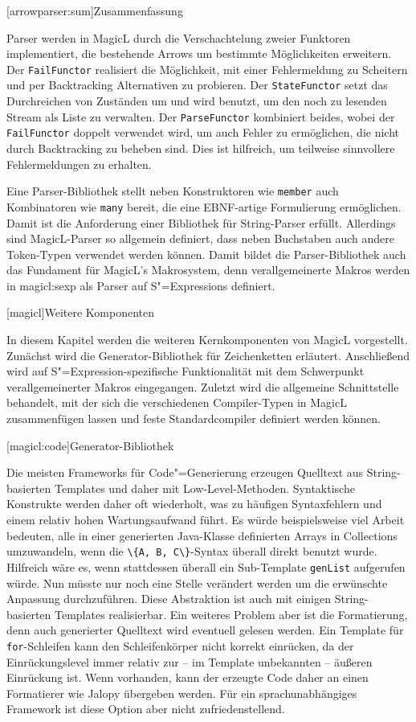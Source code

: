 \documentclass[12pt, a4paper, bibgerm]{scrbook}
\newcommand\icode[1]{\lstinline?#1?}
\newcommand\lchapter{}
\newcommand\lsection{}
\newcommand\sref{}
\newcommand{\sexp}{S"=Expression}
\newcommand{\sexps}{S"=Expressions}
\newcommand{\cgen}{Code"=Generierung}
\begin{document}
\lsection[arrowparser:sum]{Zusammenfassung}

Parser werden in MagicL durch die Verschachtelung zweier Funktoren
implementiert, die bestehende Arrows um bestimmte Möglichkeiten
erweitern. Der \icode{FailFunctor} realisiert die Möglichkeit, mit einer
Fehlermeldung zu Scheitern und per Backtracking Alternativen zu
probieren. Der \icode{StateFunctor} setzt das Durchreichen von Zuständen
um und wird benutzt, um den noch zu lesenden Stream als Liste zu
verwalten. Der \icode{ParseFunctor} kombiniert beides, wobei der
\icode{FailFunctor} doppelt verwendet wird, um auch Fehler zu
ermöglichen, die nicht durch Backtracking zu beheben sind. Dies ist
hilfreich, um teilweise sinnvollere Fehlermeldungen zu erhalten.

Eine Parser-Bibliothek stellt neben Konstruktoren wie \icode{member}
auch Kombinatoren wie \icode{many} bereit, die eine EBNF-artige
Formulierung ermöglichen. Damit ist die Anforderung einer Bibliothek
für String-Parser erfüllt. Allerdings sind MagicL-Parser so allgemein
definiert, dass neben Buchstaben auch andere Token-Typen verwendet
werden können. Damit bildet die Parser-Bibliothek auch das Fundament für
MagicL's Makrosystem, denn verallgemeinerte Makros werden in
\sref{magicl:sexp} als Parser auf \sexps{} definiert.

\lchapter[magicl]{Weitere Komponenten}

In diesem Kapitel werden die weiteren Kernkomponenten von MagicL
vorgestellt. Zunächst wird die Generator-Bibliothek für Zeichenketten
erläutert. Anschließend wird auf \sexp{}-spezifische Funktionalität
mit dem Schwerpunkt verallgemeinerter Makros eingegangen. Zuletzt wird
die allgemeine Schnittstelle behandelt, mit der sich die verschiedenen
Compiler-Typen in MagicL zusammenfügen lassen und feste Standardcompiler
definiert werden können.

\lsection[magicl:code]{Generator-Bibliothek}

Die meisten Frameworks für \cgen{} erzeugen Quelltext aus
String-basierten Templates und daher mit
Low-Level-Methoden. Syntaktische Konstrukte werden daher oft wiederholt,
was zu häufigen Syntaxfehlern und einem relativ hohen Wartungsaufwand
führt. Es würde beispielsweise viel Arbeit bedeuten, alle in einer
generierten Java-Klasse definierten Arrays in Collections umzuwandeln,
wenn die \icode{\{A, B, C\}}-Syntax überall direkt benutzt
wurde. Hilfreich wäre es, wenn stattdessen überall ein Sub-Template
\icode{genList} aufgerufen würde.  Nun müsste nur noch eine Stelle
verändert werden um die erwünschte Anpassung durchzuführen. Diese
Abstraktion ist auch mit einigen String-basierten Templates
realisierbar. Ein weiteres Problem aber ist die Formatierung, denn auch
generierter Quelltext wird eventuell gelesen werden. Ein Template für
\icode{for}-Schleifen kann den Schleifenkörper nicht korrekt einrücken,
da der Einrückungslevel immer relativ zur -- im Template
unbekannten -- äußeren Einrückung ist.  Wenn vorhanden, kann der erzeugte
Code daher an einen Formatierer wie Jalopy \cite{Jalopy} übergeben
werden. Für ein sprachunabhängiges Framework ist diese Option aber nicht
zufriedenstellend.
\end{document}
